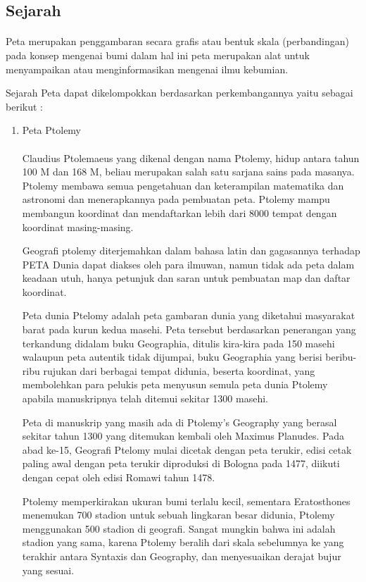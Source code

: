 \subsection{Sejarah}
\paragraph{}
Peta merupakan penggambaran secara grafis atau bentuk skala (perbandingan) pada konsep mengenai bumi dalam hal ini peta merupakan alat untuk menyampaikan atau menginformasikan mengenai ilmu kebumian.

Sejarah Peta dapat dikelompokkan berdasarkan perkembangannya yaitu sebagai berikut :
\begin{enumerate}
\item Peta Ptolemy
\paragraph{}
Claudius Ptolemaeus yang dikenal dengan nama Ptolemy, hidup antara tahun 100 M dan 168 M, beliau merupakan salah satu sarjana sains pada masanya. Ptolemy membawa semua pengetahuan dan keterampilan matematika dan astronomi dan menerapkannya pada pembuatan peta. Ptolemy mampu membangun koordinat dan mendaftarkan lebih dari 8000 tempat dengan koordinat masing-masing. 

Geografi ptolemy diterjemahkan dalam bahasa latin dan gagasannya terhadap PETA Dunia dapat diakses oleh para ilmuwan, namun tidak ada peta dalam keadaan utuh, hanya petunjuk dan saran untuk pembuatan map dan daftar koordinat.

Peta dunia Ptelomy adalah peta gambaran dunia yang diketahui masyarakat barat pada kurun kedua masehi. Peta tersebut berdasarkan penerangan yang terkandung didalam buku Geographia, ditulis kira-kira pada 150 masehi walaupun peta autentik tidak dijumpai, buku Geographia yang berisi beribu-ribu rujukan dari berbagai tempat didunia, beserta koordinat, yang membolehkan para pelukis peta menyusun semula peta dunia Ptolemy apabila manuskripnya telah ditemui sekitar 1300 masehi.

Peta di manuskrip yang masih ada di Ptolemy's Geography yang berasal sekitar tahun 1300 yang ditemukan kembali oleh Maximus Planudes. Pada abad ke-15, Geografi Ptelomy mulai dicetak dengan peta terukir, edisi cetak paling awal dengan peta terukir diproduksi di Bologna pada 1477, diikuti dengan cepat oleh edisi Romawi tahun 1478.

Ptolemy memperkirakan ukuran bumi terlalu kecil, sementara Eratosthones menemukan 700 stadion untuk sebuah lingkaran besar didunia, Ptolemy menggunakan 500 stadion di geografi. Sangat mungkin bahwa ini adalah stadion yang sama, karena Ptolemy beralih dari skala sebelumnya ke yang terakhir antara Syntaxis dan Geography, dan menyesuaikan derajat bujur yang sesuai.


\end{enumerate}
